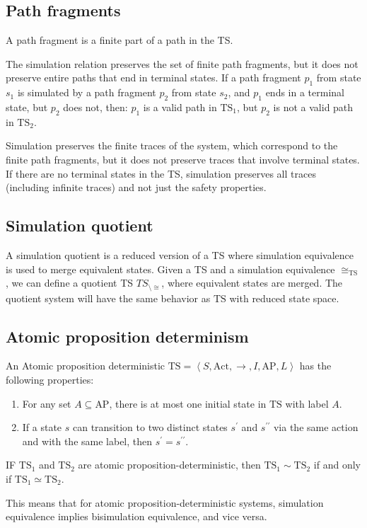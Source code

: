 \subsection{Path fragments}
\begin{definition}
    A path fragment is a finite part of a path in the TS.
\end{definition}
\noindent The simulation relation preserves the set of finite path fragments, but it does not preserve entire paths that end in terminal states.
If a path fragment $p_1$ from state $s_1$ is simulated by a path fragment $p_2$ from state $s_2$, and $p_1$ ends in a terminal state, but $p_2$ does not, then: $p_1$ is a valid path in $\text{TS}_1$, but $p_2$ is not a valid path in  $\text{TS}_2$.

Simulation preserves the finite traces of the system, which correspond to the finite path fragments, but it does not preserve traces that involve terminal states.
If there are no terminal states in the TS, simulation preserves all traces (including infinite traces) and not just the safety properties.

\subsection{Simulation quotient}
A simulation quotient is a reduced version of a TS where simulation equivalence is used to merge equivalent states.
Given a TS and a simulation equivalence $\cong_{\text{TS}}$, we can define a quotient TS $TS_{\setminus\cong}$, where equivalent states are merged.
The quotient system will have the same behavior as $\text{TS}$ with reduced state space.

\subsection{Atomic proposition determinism}
\begin{definition}
    An Atomic proposition deterministic $\text{TS}=\left\langle S,\text{Act},\rightarrow,I,\text{AP},L\right\rangle$ has the following properties: 
    \begin{enumerate}
        \item For any set $A\subseteq\text{AP}$, there is at most one initial state in $\text{TS}$ with label $A$.
        \item If a state $s$ can transition to two distinct states $s^\prime$ and $s^{\prime\prime}$ via the same action and with the same label, then $s^\prime=s^{\prime\prime}$.
    \end{enumerate}
\end{definition}
\begin{theorem}
    IF $\text{TS}_1$ and $\text{TS}_2$ are atomic proposition-deterministic, then $\text{TS}_1\sim\text{TS}_2$ if and only if $\text{TS}_1\simeq\text{TS}_2$. 
\end{theorem}
\noindent This means that for atomic proposition-deterministic systems, simulation equivalence implies bisimulation equivalence, and vice versa.

